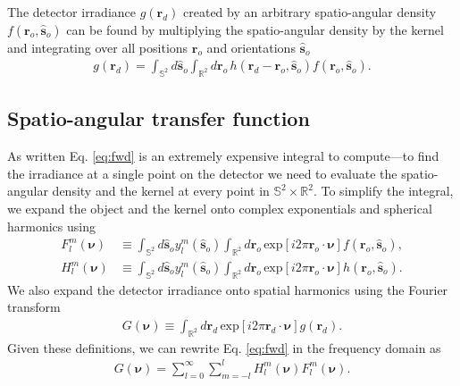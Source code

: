 \documentclass{osa-article}
\providecommand{\ro}[1]{\mathbf{\mathbf{r}}_o}
\providecommand{\so}[1]{\mathbf{\hat{s}}_o}
\providecommand{\rd}[1]{\mathbf{r}_d}
\providecommand{\mbb}[1]{\mathbb{#1}}
\providecommand{\bs}[1]{\boldsymbol{#1}}
\begin{document}
The detector irradiance $g(\rd{})$ created by an arbitrary spatio-angular
density $f(\ro{}, \so{})$ can be found by multiplying the spatio-angular density
by the kernel and integrating over all positions $\ro{}$ and orientations
$\so{}$
\begin{align}
g(\rd{}) = \int_{\mbb{S}^2}d\so{}\int_{\mbb{R}^2}d\ro{}\, h(\rd{} -\ro{}, \so{})f(\ro{}, \so{}). \label{eq:fwd}
\end{align}

\subsection{Spatio-angular transfer function}
As written Eq. \ref{eq:fwd} is an extremely expensive integral to compute---to
find the irradiance at a single point on the detector we need to evaluate the
spatio-angular density and the kernel at every point in
$\mbb{S}^2\times \mbb{R}^2$. To simplify the integral, we expand the object and
the kernel onto complex exponentials and spherical harmonics using
\begin{align}
  F_l^m(\bs{\nu}) &\equiv \int_{\mbb{S}^2}d\so{}y_l^m(\so{})\int_{\mbb{R}^2}d\ro{}\,\text{exp}\left[i2\pi \ro{}\cdot\bs{\nu}\right]f(\ro{}, \so{}),\\
  H_l^m(\bs{\nu}) &\equiv \int_{\mbb{S}^2}d\so{}y_l^m(\so{})\int_{\mbb{R}^2}d\ro{}\,\text{exp}\left[i2\pi \ro{}\cdot\bs{\nu}\right]h(\ro{}, \so{}).
\end{align}
We also expand the detector irradiance onto spatial harmonics using the Fourier
transform
\begin{align}
  G(\bs{\nu}) \equiv \int_{\mbb{R}^2}d\rd{}\,\text{exp}\left[i2\pi \rd{}\cdot\bs{\nu}\right]g(\rd{}).
\end{align}
Given these definitions, we can rewrite Eq. \ref{eq:fwd} in the frequency domain as 
\begin{align}
G(\bs{\nu}) = \sum_{l=0}^{\infty}\sum_{m=-l}^{l}H_l^m(\bs{\nu})F_l^m(\bs{\nu}). 
\end{align}
\end{document}
